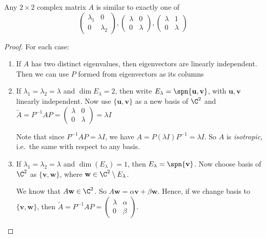 \documentclass[a4paper]{article}
\begin{document}
\begin{thm}
  Any $2\times 2$ complex matrix $A$ is similar to exactly one of
  \[
    \begin{pmatrix}
      \lambda_1 & 0\\
      0 & \lambda_2
    \end{pmatrix},
    \begin{pmatrix}
      \lambda & 0\\
      0 & \lambda
    \end{pmatrix},
    \begin{pmatrix}
      \lambda & 1\\
      0 & \lambda
    \end{pmatrix}
  \]
\end{thm}
\begin{proof}
  For each case:
  \begin{enumerate}
    \item If $A$ has two distinct eigenvalues, then eigenvectors are linearly independent. Then we can use $P$ formed from eigenvectors as its columns
    \item If $\lambda_1=\lambda_2 = \lambda$ and $\dim E_\lambda = 2$, then write $E_\lambda = \spn\{\mathbf{u}, \mathbf{v}\}$, with $\mathbf{u}, \mathbf{v}$ linearly independent. Now use $\{\mathbf{u}, \mathbf{v}\}$ as a new basis of $\C^2$ and $\tilde{A} = P^{-1}AP =
      \begin{pmatrix}
        \lambda & 0\\
        0 & \lambda
      \end{pmatrix} = \lambda I$

      Note that since $P^{-1}AP = \lambda I$, we have $A = P(\lambda I)P^{-1} = \lambda I$. So $A$ is \emph{isotropic}, i.e.\ the same with respect to any basis.
    \item If $\lambda_1 = \lambda_2 = \lambda$ and $\dim (E_\lambda) = 1$, then $E_\lambda = \spn\{\mathbf{v}\}$. Now choose basis of $\C^2$ as $\{\mathbf{v}, \mathbf{w}\}$, where $\mathbf{w}\in \C^2\setminus E_\lambda$.

      We know that $A\mathbf{w}\in \C^2$. So $A\mathbf{w} = \alpha \mathbf{v} + \beta \mathbf{w}$. Hence, if we change basis to $\{\mathbf{v}, \mathbf{w}\}$, then $\tilde{A} = P^{-1}AP =
      \begin{pmatrix}
        \lambda & \alpha\\
        0 & \beta
      \end{pmatrix}$.


\end{enumerate}
\end{proof}
\end{document}
